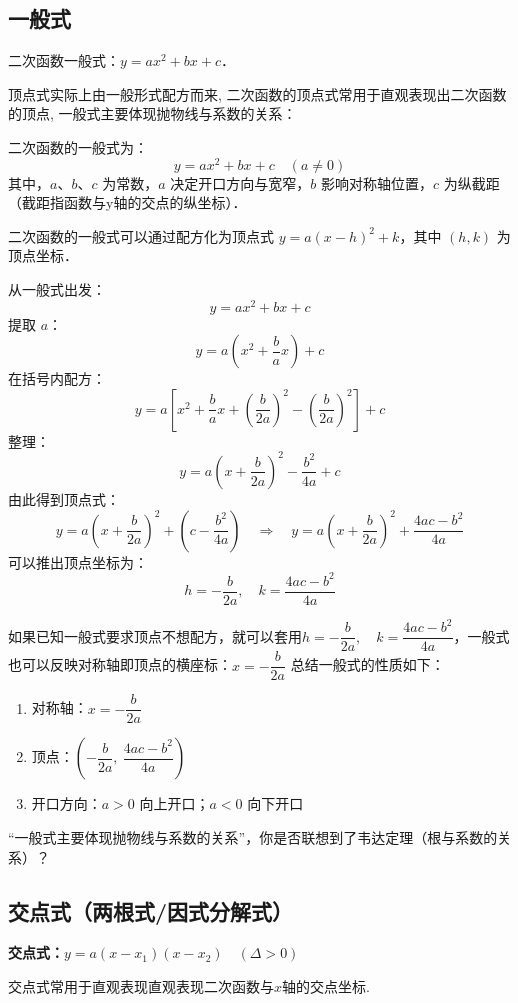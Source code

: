 
\subsection{一般式}
二次函数一般式：\(y=ax^2+bx+c\)．

顶点式实际上由一般形式配方而来, 二次函数的顶点式常用于直观表现出二次函数的顶点, 一般式主要体现抛物线与系数的关系：


二次函数的一般式为：
\[
y = ax^2 + bx + c\quad (a \neq 0)
\]
其中，$a$、$b$、$c$ 为常数，$a$ 决定开口方向与宽窄，$b$ 影响对称轴位置，$c$ 为纵截距（截距指函数与y轴的交点的纵坐标）．

二次函数的一般式可以通过配方化为顶点式 $y = a(x - h)^2 + k$，其中 $(h,k)$ 为顶点坐标．

从一般式出发：
\[
y = ax^2 + bx + c
\]
提取 $a$：
\[
y = a\left(x^2 + \frac{b}{a}x\right) + c
\]
在括号内配方：
\[
y = a\left[x^2 + \frac{b}{a}x + \left(\frac{b}{2a}\right)^2 - \left(\frac{b}{2a}\right)^2 \right] + c
\]
整理：
\[
y = a\left(x + \frac{b}{2a}\right)^2 - \frac{b^2}{4a} + c
\]
由此得到顶点式：
\[
y = a\left(x + \frac{b}{2a}\right)^2 + \left(c - \frac{b^2}{4a}\right)  \quad\Rightarrow\quad y = a\left(x + \frac{b}{2a}\right)^2 + \frac{4ac-b^2}{4a}
\]
可以推出顶点坐标为：
\[
h = -\frac{b}{2a}, \quad k = \dfrac{4ac-b^2}{4a}
\]

如果已知一般式要求顶点不想配方，就可以套用$h = -\dfrac{b}{2a}, \quad k = \dfrac{4ac-b^2}{4a}$，一般式也可以反映对称轴即顶点的横座标：\(x=-\dfrac{b}{2a}\)
总结一般式的性质如下：
\begin{enumerate}
    \item 对称轴：$x = -\dfrac{b}{2a}$
    \item 顶点：$\left(-\dfrac{b}{2a},\ \dfrac{4ac-b^2}{4a}\right)$
    \item 开口方向：$a > 0$ 向上开口；$a < 0$ 向下开口
\end{enumerate}


“一般式主要体现抛物线与系数的关系”，你是否联想到了韦达定理（根与系数的关系）？


\subsection{交点式（两根式/因式分解式）}
\textbf{交点式：\(y=a(x-x_1)(x-x_2) \quad (\Delta>0)\)}

交点式常用于直观表现直观表现二次函数与\(x\)轴的交点坐标.

